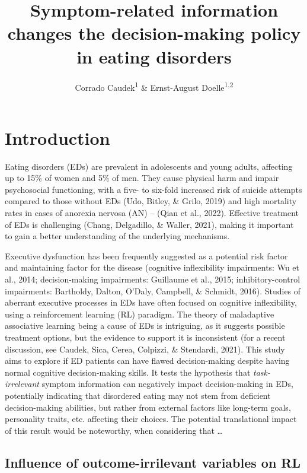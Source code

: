 \documentclass[
  man,floatsintext]{apa6}
\title{Symptom-related information changes the decision-making policy in eating disorders}
\author{Corrado Caudek\textsuperscript{1} \& Ernst-August Doelle\textsuperscript{1,2}}
\date{}
\affiliation{\vspace{0.5cm}\textsuperscript{1} Wilhelm-Wundt-University\\\textsuperscript{2} Konstanz Business School}
\begin{document}
\maketitle

\hypertarget{introduction}{%
\section{Introduction}\label{introduction}}

Eating disorders (EDs) are prevalent in adolescents and young adults, affecting up to 15\% of women and 5\% of men. They cause physical harm and impair psychosocial functioning, with a five- to six-fold increased risk of suicide attempts compared to those without EDs (Udo, Bitley, \& Grilo, 2019) and high mortality rates in cases of anorexia nervosa (AN) -- (Qian et al., 2022). Effective treatment of EDs is challenging (Chang, Delgadillo, \& Waller, 2021), making it important to gain a better understanding of the underlying mechanisms.

Executive dysfunction has been frequently suggested as a potential risk factor and maintaining factor for the disease (cognitive inflexibility impairments: Wu et al., 2014; decision-making impairments: Guillaume et al., 2015; inhibitory-control impairments: Bartholdy, Dalton, O'Daly, Campbell, \& Schmidt, 2016). Studies of aberrant executive processes in EDs have often focused on cognitive inflexibility, using a reinforcement learning (RL) paradigm. The theory of maladaptive associative learning being a cause of EDs is intriguing, as it suggests possible treatment options, but the evidence to support it is inconsistent (for a recent discussion, see Caudek, Sica, Cerea, Colpizzi, \& Stendardi, 2021). This study aims to explore if ED patients can have flawed decision-making despite having normal cognitive decision-making skills. It tests the hypothesis that \emph{task-irrelevant} symptom information can negatively impact decision-making in EDs, potentially indicating that disordered eating may not stem from deficient decision-making abilities, but rather from external factors like long-term goals, personality traits, etc. affecting their choices. The potential translational impact of this result would be noteworthy, when considering that \ldots{}

\hypertarget{influence-of-outcome-irrilevant-variables-on-rl}{%
\subsection{Influence of outcome-irrilevant variables on RL}\label{influence-of-outcome-irrilevant-variables-on-rl}}
\end{document}
